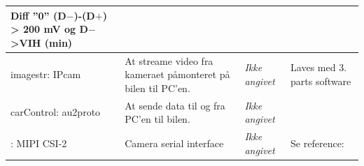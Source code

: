 \begin{table}[h]
\begin{tabularx}{\textwidth}{|l|Z|Z|Z|}
		Diff ''0''						\newline
		(D$-$)-(D$+$) > 200 mV			\newline
		og D$-$>VIH (min)				\newline
	\\ \hline	
	
imagestr: IPcam
	& At streame video fra kameraet påmonteret på bilen til PC'en.
	& \textit{Ikke angivet} 
	& Laves med 3. parts software	
	\\ \hline

carControl: au2proto
	& At sende data til og fra PC'en til bilen.
	& \textit{Ikke angivet} 
	& ~
	\\ \hline
	
: MIPI CSI-2
	& Camera serial interface
	& \textit{Ikke angivet} 
	& Se reference: \cite{lib:MIPICSI-2}
	\\ \hline
	\end{tabularx}
\end{table}
